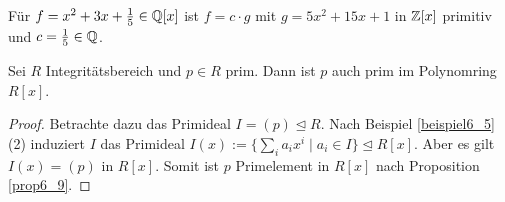 \begin{beispiel}\label{beispiel6_21}
	Für $f = x^2 + 3x + \frac{1}{5} \in \mathbb{Q}[x]$ ist $f = c\cdot g$ mit $g = 5x^2 + 15 x + 1$ in $\mathbb{Z}[x]$ primitiv und $c = \frac{1}{5} \in \mathbb{Q}$.
\end{beispiel}
\begin{rem}\label{rem6_22}
	Sei $R$ Integritätsbereich und $p \in R$ prim. Dann ist $p$ auch prim im Polynomring $R[x]$.
	\begin{proof}
		Betrachte dazu das Primideal $I = (p) \unlhd R$. Nach Beispiel \ref{beispiel6_5} (2) induziert $I$ das Primideal $I(x) := \{\sum_i a_i x^i \mid a_i \in I\} \unlhd R[x]$. Aber es gilt $I(x) = (p)$ in $R[x]$. Somit ist $p$ Primelement in $R[x]$ nach Proposition \ref{prop6_9}.
	\end{proof}
\end{rem}

